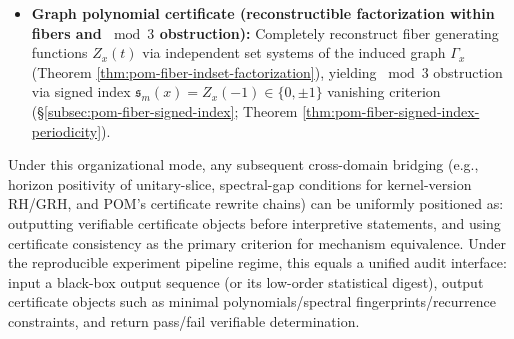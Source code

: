 \begin{itemize}
  \item \textbf{Graph polynomial certificate (reconstructible factorization within fibers and \texorpdfstring{$\bmod 3$}{mod 3} obstruction):}
  Completely reconstruct fiber generating functions \(Z_x(t)\) via independent set systems of the induced graph \(\Gamma_x\) (Theorem \ref{thm:pom-fiber-indset-factorization}), yielding \(\bmod 3\) obstruction via signed index \(\mathfrak{s}_m(x)=Z_x(-1)\in\{0,\pm 1\}\) vanishing criterion (\S\ref{subsec:pom-fiber-signed-index}; Theorem \ref{thm:pom-fiber-signed-index-periodicity}).
\end{itemize}
Under this organizational mode, any subsequent cross-domain bridging (e.g., horizon positivity of unitary-slice, spectral-gap conditions for kernel-version RH/GRH, and POM's certificate rewrite chains) can be uniformly positioned as: outputting verifiable certificate objects before interpretive statements, and using certificate consistency as the primary criterion for mechanism equivalence.
Under the reproducible experiment pipeline regime, this equals a unified audit interface: input a black-box output sequence (or its low-order statistical digest), output certificate objects such as minimal polynomials/spectral fingerprints/recurrence constraints, and return pass/fail verifiable determination.

